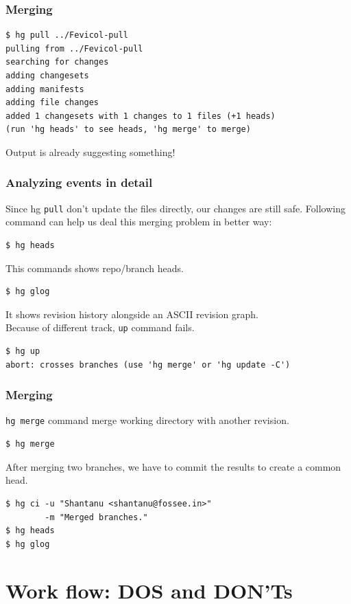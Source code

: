 \documentclass[14pt,compress]{beamer}
\newcounter{time}
\newcommand{\inctime}[1]{\addtocounter{time}{#1}{\tiny \thetime\ m}}
\newcommand{\typ}[1]{\lstinline{#1}}
\begin{document}
\begin{frame}[fragile]
  \frametitle{Merging}
  \begin{lstlisting}
$ hg pull ../Fevicol-pull
pulling from ../Fevicol-pull
searching for changes
adding changesets
adding manifests
adding file changes
added 1 changesets with 1 changes to 1 files (+1 heads)
(run 'hg heads' to see heads, 'hg merge' to merge)    
  \end{lstlisting} %
  Output is already suggesting something!
\end{frame}

\begin{frame}[fragile]
  \frametitle{Analyzing events in detail}
  Since hg \typ{pull} don't update the files directly, our changes are still safe. Following command can help us deal this merging problem in better way:
  \begin{lstlisting}
$ hg heads
  \end{lstlisting}
  This commands shows repo/branch heads.
  \begin{lstlisting}
$ hg glog    
  \end{lstlisting}
  It shows revision history alongside an ASCII revision graph.\\
  Because of different track, \typ{up} command fails.
  \begin{lstlisting}
$ hg up
abort: crosses branches (use 'hg merge' or 'hg update -C')
  \end{lstlisting} %
\end{frame}

\begin{frame}[fragile]
  \frametitle{Merging}
  \typ{hg merge} command merge working directory with another revision.
  \begin{lstlisting}
$ hg merge    
  \end{lstlisting} %
  After merging two branches, we have to commit the results to create a common head.
  \begin{lstlisting}
$ hg ci -u "Shantanu <shantanu@fossee.in>" 
        -m "Merged branches."
$ hg heads    
$ hg glog
  \end{lstlisting} %
  \inctime{15}
\end{frame}

\section{Work flow: DOS and DON'Ts}
\end{document}
